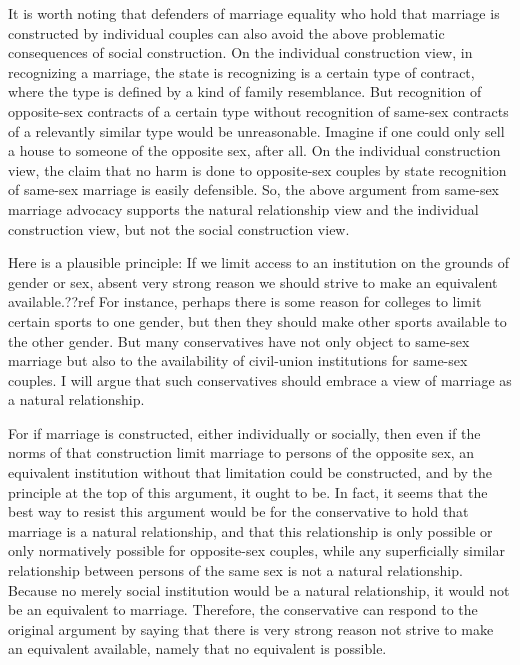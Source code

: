 It is worth noting that defenders of marriage equality who  hold that marriage is constructed by individual couples can also avoid the above problematic consequences
of social construction. On the individual construction view, in recognizing a marriage, the state is recognizing is a certain type of contract, where the type is
defined by a kind of family resemblance. But recognition of opposite-sex contracts
of a certain type without recognition of same-sex contracts of a relevantly similar type would be unreasonable. Imagine if one could only sell a house to someone of
the opposite sex, after all. On the individual construction view, the claim that no harm is done to opposite-sex couples by state recognition of same-sex marriage is
easily defensible. So, the above argument from same-sex marriage advocacy supports the natural relationship view and the individual construction view, but not the social
construction view.

Here is a plausible principle: If we limit access to an institution on the grounds of gender or sex, absent very strong reason we should strive to make an equivalent
available.??ref For instance, perhaps there is some reason for colleges to limit certain sports to one gender, but then they should make other sports available
to the other gender.
But many conservatives have not only object to same-sex marriage but also to the availability of civil-union institutions for same-sex couples. I will argue that
such conservatives should embrace a view of marriage as a natural relationship.

For if marriage is constructed, either individually or socially, then even if the norms of that construction limit marriage to persons of the opposite sex, an
equivalent institution without that limitation could be constructed, and by the principle at the top of this argument, it ought to be. In fact, it seems that
the best way to resist this argument would be for the conservative to hold that marriage is a natural relationship, and that this relationship is only possible
or only normatively possible for opposite-sex couples, while any superficially similar relationship between persons of the same sex is not a natural relationship.
Because no merely social institution would be a natural relationship, it would not be an equivalent to marriage. Therefore, the conservative can respond to the
original argument by saying that there is very strong reason not strive to make an equivalent available, namely that no equivalent is possible.

